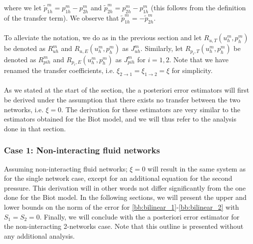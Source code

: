 where we let $\tilde{p}_{1h}^m=p_{1h}^m-p_{2h}^m$ and $\tilde{p}_{2h}^m=p_{2h}^m-p_{1h}^m$ (this follows from the definition of the transfer term). We observe that $\tilde{p}_{1h}^m=-\tilde{p}_{2h}^m$.
\\
\\
To alleviate the notation, we do as in the previous section and let $R_{u,T}(u^m_h,p^m_h)$ be denoted as $R^m_{uh}$ and $R_{u,E}(u^m_h,p^m_h)$ as $J^m_{uh}$. Similarly, let $R_{p_i,T}(u^m_h,p^m_h)$ be denoted as $R^m_{pih}$ and $R_{p_i,E}(u^m_h,p^m_h)$ as $J^m_{pih}$ for $i=1,2$. Note that we have renamed the transfer coefficients, i.e. $\xi_{2\to 1} = \xi_{1\to 2} = \xi$ for simplicity.
\\
\\
As we stated at the start of the section, the a posteriori error estimators will first be derived under the assumption that there exists no transfer between the two networks, i.e. $\xi = 0$. The derivation for these estimators are very similar to the estimators obtained for the Biot model, and we will thus refer to the analysis done in that section. 
\subsubsection{Case 1: Non-interacting fluid networks} \label{bb:case1_res_err}
Assuming non-interacting fluid networks; $\xi = 0$ will result in the same system as for the single network case, except for an additional equation for the second pressure. This derivation will in other words not differ significantly from the one done for the Biot model. In the following sections, we will present the upper and lower bounds on the norm of the error for \eqref{bb:bilinear_1}-\eqref{bb:bilinear_2} with $S_1=S_2=0$. Finally, we will conclude with the a posteriori error estimator for the non-interacting 2-networks case. Note that this outline is presented without any additional analysis.
